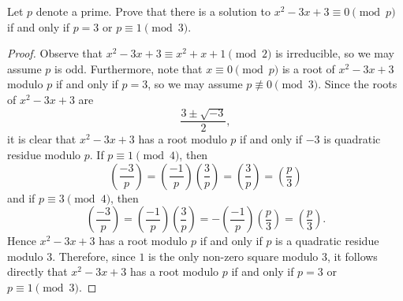 \documentclass[10pt]{amsart}
\begin{document}
\begin{thm}\label{ex3}
  Let $p$ denote a prime.
  Prove that there is a solution to $x^2 - 3x + 3 \equiv 0 \pmod{p}$ if and only if $p = 3$ or $p \equiv 1 \pmod{3}$.

  \begin{proof}
    Observe that $x^2 - 3x + 3 \equiv x^2 + x + 1 \pmod{2}$ is irreducible, so we may assume $p$ is odd.
    Furthermore, note that $x \equiv 0 \pmod{p}$ is a root of $x^2 - 3x + 3$ modulo $p$ if and only if $p = 3$, so we may assume $p \not \equiv 0 \pmod{3}$.
    Since the roots of $x^2 - 3x + 3$ are 
    $$\frac{3 \pm \sqrt{-3}}{2},$$
    it is clear that $x^2 - 3x + 3$ has a root modulo $p$ if and only if $-3$ is quadratic residue modulo $p$.
    If $p \equiv 1 \pmod{4}$, then 
    $$\left(\frac{-3}{p}\right) = \left(\frac{-1}{p}\right)\left(\frac{3}{p}\right) = \left(\frac{3}{p}\right) = \left(\frac{p}{3}\right)$$
    and if $p \equiv 3 \pmod{4}$, then
    $$\left(\frac{-3}{p}\right) = \left(\frac{-1}{p}\right)\left(\frac{3}{p}\right) = -\left(\frac{-1}{p}\right)\left(\frac{p}{3}\right) = \left(\frac{p}{3}\right).$$
    Hence $x^2 - 3x + 3$ has a root modulo $p$ if and only if $p$ is a quadratic residue modulo $3$.
    Therefore, since $1$ is the only non-zero square modulo $3$, it follows directly that $x^2 - 3x + 3$ has a root modulo $p$ if and only if $p = 3$ or $p \equiv 1 \pmod{3}$.
  \end{proof}
\end{thm}
\end{document}
